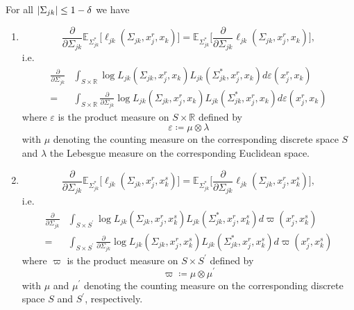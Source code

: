 \begin{lemma}\label{expectation_commutes_case2}
    For all $\lvert\Sigma_{jk}\rvert \leq 1-\delta$ we have
    \begin{enumerate}
        \item \begin{equation*}
                  \frac{\partial }{\partial \Sigma_{jk}} \mathbb{E}_{\Sigma_{jk}^*} \big[\ell_{jk}(\Sigma_{jk}, x^r_j,x_k)\big] = \mathbb{E}_{\Sigma_{jk}^*} \Bigg[\frac{\partial }{\partial \Sigma_{jk}} \ell_{jk}(\Sigma_{jk}, x^r_j,x_k) \Bigg],
              \end{equation*}
              i.e.
              \begin{align*}
                  \frac{\partial }{\partial \Sigma_{jk}} & \int_{S\times \mathbb{R}} \log L_{jk}(\Sigma_{jk}, x^r_j,x_k) L_{jk}(\Sigma_{jk}^*, x^r_j,x_k) d\varepsilon(x^r_j,x_k)                                        \\
                  =                                      & \int_{S\times \mathbb{R}} \frac{\partial }{\partial \Sigma_{jk}} \log L_{jk}(\Sigma_{jk}, x^r_j,x_k) L_{jk}(\Sigma_{jk}^*, x^r_j,x_k) d\varepsilon(x^r_j,x_k)
              \end{align*}
              where $\varepsilon$ is the product measure on $S \times \mathbb{R}$ defined by
              \begin{equation*}
                  \varepsilon \coloneqq \mu \otimes \lambda
              \end{equation*}
              with $\mu$ denoting the counting measure on the corresponding discrete space $S$ and $\lambda$ the Lebesgue measure on the corresponding Euclidean space.
        \item \begin{equation*}
                  \frac{\partial }{\partial \Sigma_{jk}} \mathbb{E}_{\Sigma_{jk}^*} \big[\ell_{jk}(\Sigma_{jk}, x_j^r,x_k^s)\big] = \mathbb{E}_{\Sigma_{jk}^*} \Bigg[\frac{\partial }{\partial \Sigma_{jk}} \ell_{jk}(\Sigma_{jk}, x_j^r,x_k^s) \Bigg],
              \end{equation*}
              i.e.
              \begin{align*}
                  \frac{\partial }{\partial \Sigma_{jk}} & \int_{S\times S^\prime} \log L_{jk}(\Sigma_{jk}, x_j^r,x_k^s) L_{jk}(\Sigma_{jk}^*, x_j^r,x_k^s) d\varpi(x_j^r,x_k^s)                                        \\
                  =                                      & \int_{S\times S^\prime} \frac{\partial }{\partial \Sigma_{jk}} \log L_{jk}(\Sigma_{jk}, x_j^r,x_k^s) L_{jk}(\Sigma_{jk}^*, x_j^r,x_k^s) d\varpi(x_j^r,x_k^s)
              \end{align*}
              where $\varpi$ is the product measure on $S \times S^\prime$ defined by
              \begin{equation*}
                  \varpi \coloneqq \mu \otimes \mu^\prime
              \end{equation*}
              with $\mu$ and $\mu^\prime$ denoting the counting measure on the corresponding discrete space $S$ and $S^\prime$, respectively.
    \end{enumerate}


\end{lemma}
